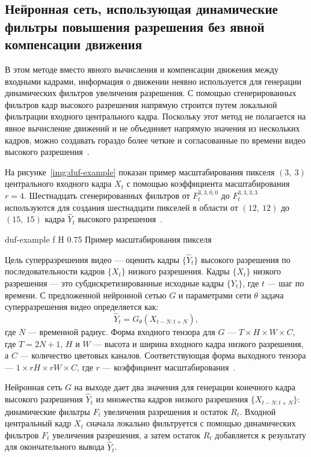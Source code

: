 \documentclass{bmstu}
\begin{document}
\subsection{Нейронная сеть, использующая динамические фильтры повышения разрешения без явной компенсации движения}

В этом методе вместо явного вычисления и компенсации движения между входными кадрами, информация о движении неявно используется для генерации динамических фильтров увеличения разрешения. 
С помощью сгенерированных фильтров кадр высокого разрешения напрямую строится путем локальной фильтрации входного центрального кадра. 
Поскольку этот метод не полагается на явное вычисление движений и не объединяет напрямую значения из нескольких кадров, можно создавать гораздо более четкие и согласованные по времени видео высокого разрешения~\cite{Younghyun2018}.

На рисунке~\ref{img:duf-example} показан пример масштабирования пикселя $(3,~3)$ центрального входного кадра $X_t$ с помощью коэффициента масштабирования $r = 4$. 
Шестнадцать сгенерированных фильтров от $F^{3,3,0,0}_t$ до $F^{3,3,3,3}_t$ используются для создания шестнадцати пикселей в области от $(12,~12)$ до $(15,~15)$ кадра $\hat{Y}_t$ высокого разрешения~\cite{Younghyun2018}.

    {duf-example}
    {f}
    {H}
    {0.75\textwidth}
    {Пример масштабирования пикселя~\cite{Younghyun2018}}
    
Цель суперразрешения видео --- оценить кадры $\{\hat{Y}_t\}$ высокого разрешения по последовательности кадров $\{X_t\}$ низкого разрешения. 
Кадры $\{X_t\}$ низкого разрешения --- это субдискретизированные исходные кадры $\{Y_t\}$, где $t$ --- шаг по времени. 
С предложенной нейронной сетью $G$ и параметрами сети $\theta$ задача суперразрешения видео определяется как:
\begin{equation}
\hat{Y}_t = G_\theta(X_{t - N:t + N}),
\end{equation}
где $N$ --- временной радиус. 
Форма входного тензора для $G$ --- $T \times H \times W \times C$, где $T = 2N + 1$, $H$ и $W$ --- высота и ширина входного кадра низкого разрешения, а $C$ --- количество цветовых каналов. 
Соответствующая форма выходного тензора --- $1 \times rH \times rW \times C$, где $r$ --- коэффициент масштабирования~\cite{Younghyun2018}.

Нейронная сеть $G$ на выходе дает два значения для генерации конечного кадра высокого разрешения $\hat{Y}_t$ из множества кадров низкого разрешения $\{X_{t - N:t + N}\}$: динамические фильтры $F_t$ увеличения разрешения и остаток $R_t$. 
Входной центральный кадр $X_t$ сначала локально фильтруется с помощью динамических фильтров $F_t$ увеличения разрешения, а затем остаток $R_t$ добавляется к результату для окончательного вывода $\hat{Y}_t$.
\end{document}
